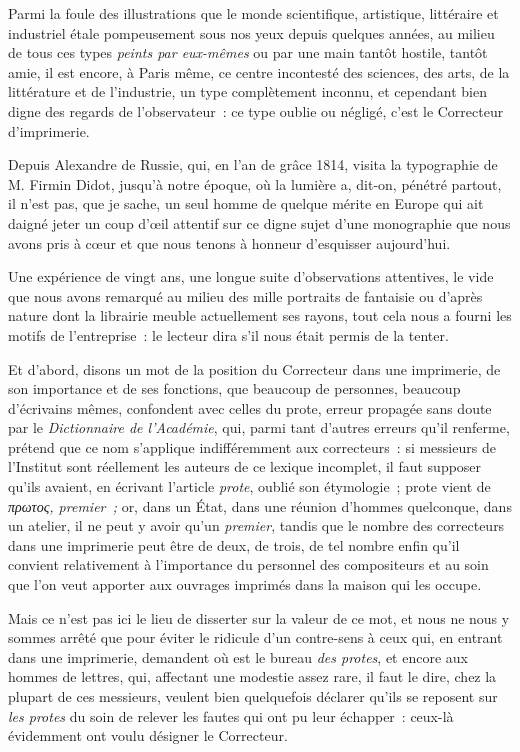 \documentclass[french,twoside]{book} %
\newcommand{\bibl}[1]{{\RaggedLeft{#1}\par\bigskip}}
\begin{document}
\bibl{Livius.}
\noindent Parmi la foule des illustrations que le monde scientifique, artistique, littéraire et industriel étale pompeusement sous nos yeux depuis quelques années, au milieu de tous ces types \emph{peints par eux-mêmes} ou par une main tantôt hostile, tantôt amie, il est encore, à Paris même, ce centre incontesté des  sciences, des arts, de la littérature et de l’industrie, un type complètement inconnu, et cependant bien digne des regards de l’observateur : ce type oublie ou négligé, c’est le Correcteur d’imprimerie.\par
Depuis Alexandre de Russie, qui, en l’an de grâce 1814, visita la typographie de M. Firmin Didot, jusqu’à notre époque, où la lumière a, dit-on, pénétré partout, il n’est pas, que je sache, un seul homme de quelque mérite en Europe qui ait daigné jeter un coup d’œil attentif sur ce digne sujet d’une monographie que nous avons pris à cœur et que nous tenons à honneur d’esquisser aujourd’hui.\par
Une expérience de vingt ans, une longue suite d’observations attentives, le vide que nous avons remarqué au milieu des mille portraits de fantaisie ou d’après nature dont la librairie meuble actuellement ses rayons, tout cela nous a fourni les motifs de l’entreprise :  le lecteur dira s’il nous était permis de la tenter.\par
Et d’abord, disons un mot de la position du Correcteur dans une imprimerie, de son importance et de ses fonctions, que beaucoup de personnes, beaucoup d’écrivains mêmes, confondent avec celles du prote, erreur propagée sans doute par le \emph{Dictionnaire de l’Académie}, qui, parmi tant d’autres erreurs qu’il renferme, prétend que ce nom s’applique indifféremment aux correcteurs : si messieurs de l’Institut sont réellement les auteurs de ce lexique incomplet, il faut supposer qu’ils avaient, en écrivant l’article \emph{prote}, oublié son étymologie ; prote vient de \emph{πρωτος, premier ;} or, dans un État, dans une réunion d’hommes quelconque, dans un atelier, il ne peut y avoir qu’un \emph{premier}, tandis que le nombre des correcteurs dans une imprimerie peut être de deux, de trois, de tel nombre enfin qu’il convient relativement à  l’importance du personnel des compositeurs et au soin que l’on veut apporter aux ouvrages imprimés dans la maison qui les occupe.\par
Mais ce n’est pas ici le lieu de disserter sur la valeur de ce mot, et nous ne nous y sommes arrêté que pour éviter le ridicule d’un contre-sens à ceux qui, en entrant dans une imprimerie, demandent où est le bureau \emph{des protes}, et encore aux hommes de lettres, qui, affectant une modestie assez rare, il faut le dire, chez la plupart de ces messieurs, veulent bien quelquefois déclarer qu’ils se reposent sur \emph{les protes} du soin de relever les fautes qui ont pu leur échapper : ceux-là évidemment ont voulu désigner le Correcteur.\par
\end{document}
